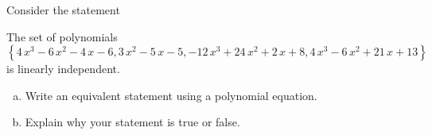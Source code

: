 
\begin{exerciseStatement}


Consider the statement 
\begin{center}\begin{minipage}{0.8\textwidth}
 The set of polynomials \( \left\{ 4 \, x^{3} - 6 \, x^{2} - 4 \, x - 6 , 3 \, x^{2} - 5 \, x - 5 , -12 \, x^{3} + 24 \, x^{2} + 2 \, x + 8 , 4 \, x^{3} - 6 \, x^{2} + 21 \, x + 13 \right\} \) is linearly independent.
\end{minipage}\end{center}
    


\begin{enumerate}[(a)]
\item  Write an equivalent statement using a polynomial equation.
\item  Explain why your statement is true or false.
\end{enumerate}
    
\end{exerciseStatement}
    
